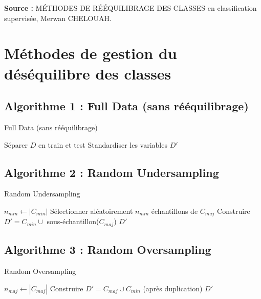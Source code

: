 \documentclass[a4paper,12pt]{article}
\begin{document}
\bigskip
\textbf{Source :} MÉTHODES DE RÉÉQUILIBRAGE DES CLASSES en classification supervisée, Merwan CHELOUAH.



\newpage

\section*{Méthodes de gestion du déséquilibre des classes}

\subsection*{Algorithme 1 : Full Data (sans rééquilibrage)}
\begin{algorithm}[H]
\caption{Full Data (sans rééquilibrage)}

Séparer $D$ en train et test\;
Standardiser les variables\;
\Return $D'$\;
\end{algorithm}

\subsection*{Algorithme 2 : Random Undersampling}
\begin{algorithm}[H]
\caption{Random Undersampling}

$n_{min} \gets |C_{min}|$ \;
Sélectionner aléatoirement $n_{min}$ échantillons de $C_{maj}$\;
Construire $D' = C_{min} \cup$ sous-échantillon($C_{maj}$)\;
\Return $D'$\;
\end{algorithm}

\subsection*{Algorithme 3 : Random Oversampling}
\begin{algorithm}[H]
\caption{Random Oversampling}

$n_{maj} \gets |C_{maj}|$ \;
Construire $D' = C_{maj} \cup C_{min}$ (après duplication)\;
\Return $D'$\;
\end{algorithm}
\end{document}
